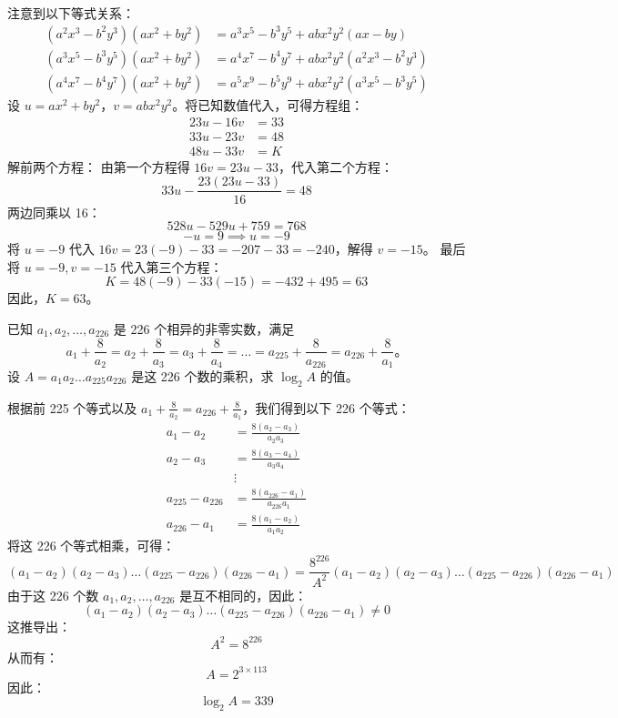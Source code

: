 \begin{questions}
\begin{solution}
注意到以下等式关系：
\begin{align*}
(a^2x^3 - b^2y^3)(ax^2 + by^2) &= a^3x^5 - b^3y^5 + abx^2y^2(ax - by) \\
(a^3x^5 - b^3y^5)(ax^2 + by^2) &= a^4x^7 - b^4y^7 + abx^2y^2(a^2x^3 - b^2y^3) \\
(a^4x^7 - b^4y^7)(ax^2 + by^2) &= a^5x^9 - b^5y^9 + abx^2y^2(a^3x^5 - b^3y^5)
\end{align*}
设 $u = ax^2 + by^2$，$v = abx^2y^2$。将已知数值代入，可得方程组：
\begin{align*}
23u - 16v &= 33 \\
33u - 23v &= 48 \\
48u - 33v &= K
\end{align*}
解前两个方程：
由第一个方程得 $16v = 23u - 33$，代入第二个方程：
\[
33u - \frac{23(23u - 33)}{16} = 48
\]
两边同乘以 16：
\[
528u - 529u + 759 = 768
\]
\[
-u = 9 \implies u = -9
\]
将 $u = -9$ 代入 $16v = 23(-9) - 33 = -207 - 33 = -240$，解得 $v = -15$。
最后将 $u = -9, v = -15$ 代入第三个方程：
\[
K = 48(-9) - 33(-15) = -432 + 495 = 63
\]
因此，$K = 63$。
\end{solution}

\question 已知 $a_1, a_2, \dots, a_{226}$ 是 226 个相异的非零实数，满足
\[ a_1 + \frac{8}{a_2} = a_2 + \frac{8}{a_3} = a_3 + \frac{8}{a_4} = \dots = a_{225} + \frac{8}{a_{226}} = a_{226} + \frac{8}{a_1} \text{。} \]
设 $A = a_1 a_2 \dots a_{225} a_{226}$ 是这 226 个数的乘积，求 $\log_2 A$ 的值。

\begin{solution}
根据前 225 个等式以及 $a_1 + \frac{8}{a_2} = a_{226} + \frac{8}{a_1}$，我们得到以下 226 个等式：
\begin{align*}
a_1 - a_2 &= \frac{8(a_2 - a_3)}{a_2 a_3} \\
a_2 - a_3 &= \frac{8(a_3 - a_4)}{a_3 a_4} \\
&\vdots \\
a_{225} - a_{226} &= \frac{8(a_{226} - a_1)}{a_{226} a_1} \\
a_{226} - a_1 &= \frac{8(a_1 - a_2)}{a_1 a_2}
\end{align*}
将这 226 个等式相乘，可得：
\[ (a_1 - a_2)(a_2 - a_3) \dots (a_{225} - a_{226})(a_{226} - a_1) = \frac{8^{226}}{A^2} (a_1 - a_2)(a_2 - a_3) \dots (a_{225} - a_{226})(a_{226} - a_1) \]
由于这 226 个数 $a_1, a_2, \dots, a_{226}$ 是互不相同的，因此：
\[ (a_1 - a_2)(a_2 - a_3) \dots (a_{225} - a_{226})(a_{226} - a_1) \neq 0 \]
这推导出：
\[ A^2 = 8^{226} \]
从而有：
\[ A = 2^{3 \times 113} \]
因此：
\[ \log_2 A = 339 \]
\end{solution}


\end{questions}

